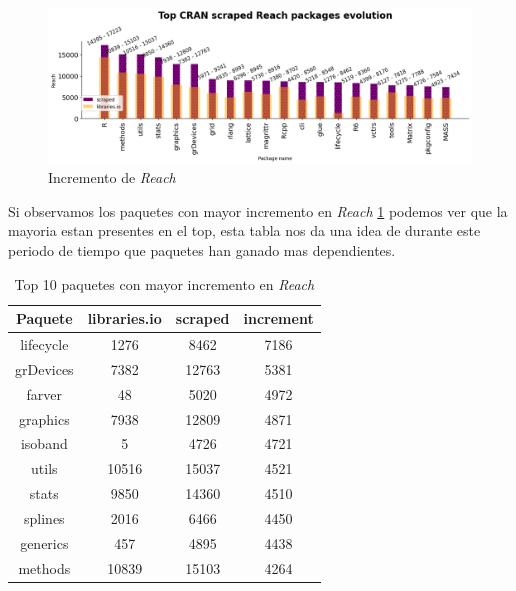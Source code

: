 \begin{figure}[h!]
    \begin{center}
        \includegraphics[width=1\textwidth]{img/cran/reach_top2.png}
        \caption{Incremento de \textit{Reach}}
        \label{fig:Top reach scraped}
    \end{center}
\end{figure}

Si observamos los paquetes con mayor incremento en \textit{Reach} \ref{tab:Top 10 paquetes con mayor incremento en Reach}
podemos ver que la mayoria estan presentes en el top, esta tabla nos da una idea de durante este periodo
de tiempo que paquetes han ganado mas dependientes.

\begin{table}[h!]
    \begin{center}
        \begin{tabular}{|c|c|c|c|}
            \hline
            \textbf{Paquete} & \textbf{libraries.io} & \textbf{scraped} & \textbf{increment} \\
            \hline
            lifecycle        & 1276                  & 8462             & 7186               \\
            grDevices        & 7382                  & 12763            & 5381               \\
            farver           & 48                    & 5020             & 4972               \\
            graphics         & 7938                  & 12809            & 4871               \\
            isoband          & 5                     & 4726             & 4721               \\
            utils            & 10516                 & 15037            & 4521               \\
            stats            & 9850                  & 14360            & 4510               \\
            splines          & 2016                  & 6466             & 4450               \\
            generics         & 457                   & 4895             & 4438               \\
            methods          & 10839                 & 15103            & 4264               \\
            \hline
        \end{tabular}
        \caption{Top 10 paquetes con mayor incremento en \textit{Reach}}
        \label{tab:Top 10 paquetes con mayor incremento en Reach}
    \end{center}
\end{table}

